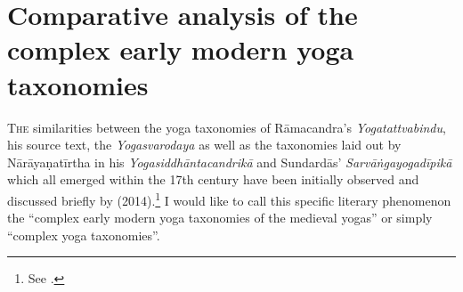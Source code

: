 \chapter{Comparative analysis of the complex early modern yoga taxonomies}
\label{yogas_list}
\label{yogatax}
\clearpage
\noindent
\lettrine[lines=2, lhang=0.2, loversize=0.25]{T}{he} similarities between the yoga taxonomies of Rāmacandra's \textit{Yogatattvabindu}, his source text, the \textit{Yogasvarodaya} as well as the taxonomies laid out by Nārāyaṇatīrtha in his \textit{Yogasiddhāntacandrikā} and Sundardās' \textit{Sarvāṅgayogadīpikā} which all emerged within the 17th century have been initially observed and discussed briefly by \citeauthor{birch2014} (2014).\footnote{See \citeauthor[2014: 415-416]{birch2014}.} I would like to call this specific literary phenomenon the ``complex early modern yoga taxonomies of the medieval yogas'' or simply ``complex yoga taxonomies''.

